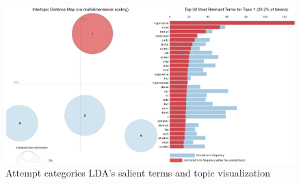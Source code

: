 \documentclass[sn-mathphys,Numbered]{sn-jnl}%
\theoremstyle{thmstyleone}%
\theoremstyle{thmstyletwo}%
\theoremstyle{thmstylethree}%
\begin{document}
\begin{figure}[h!]
    \includegraphics[width=\textwidth]{Attempt_pyldvis.png}
    \caption{Attempt categories LDA's salient terms and topic visualization}
    \label{Attempt_pyldvis}
\end{figure}
\end{document}
